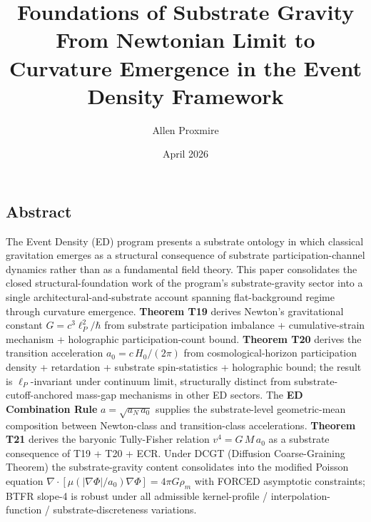\documentclass[
  11pt,a4paper]{article}
\title{Foundations of Substrate Gravity\\
\large From Newtonian Limit to Curvature Emergence in the Event Density
Framework}
\author{Allen Proxmire}
\date{April 2026}
\begin{document}
\maketitle

\subsection{Abstract}\label{abstract}

The Event Density (ED) program presents a substrate ontology in which
classical gravitation emerges as a structural consequence of substrate
participation-channel dynamics rather than as a fundamental field
theory. This paper consolidates the closed structural-foundation work of
the program's substrate-gravity sector into a single
architectural-and-substrate account spanning flat-background regime
through curvature emergence. \textbf{Theorem T19} derives Newton's
gravitational constant \(G = c^3\ell_P^2/\hbar\) from substrate
participation imbalance + cumulative-strain mechanism + holographic
participation-count bound. \textbf{Theorem T20} derives the transition
acceleration \(a_0 = c\,H_0/(2\pi)\) from cosmological-horizon
participation density + retardation + substrate spin-statistics +
holographic bound; the result is \(\ell_P\)-invariant under continuum
limit, structurally distinct from substrate-cutoff-anchored mass-gap
mechanisms in other ED sectors. The \textbf{ED Combination Rule}
\(a = \sqrt{a_N\,a_0}\) supplies the substrate-level geometric-mean
composition between Newton-class and transition-class accelerations.
\textbf{Theorem T21} derives the baryonic Tully-Fisher relation
\(v^4 = G\,M\,a_0\) as a substrate consequence of T19 + T20 + ECR. Under
DCGT (Diffusion Coarse-Graining Theorem) the substrate-gravity content
consolidates into the modified Poisson equation
\(\nabla\cdot[\mu(|\nabla\Phi|/a_0)\nabla\Phi] = 4\pi G\rho_m\) with
FORCED asymptotic constraints; BTFR slope-4 is robust under all
admissible kernel-profile / interpolation-function /
substrate-discreteness variations.
\end{document}
